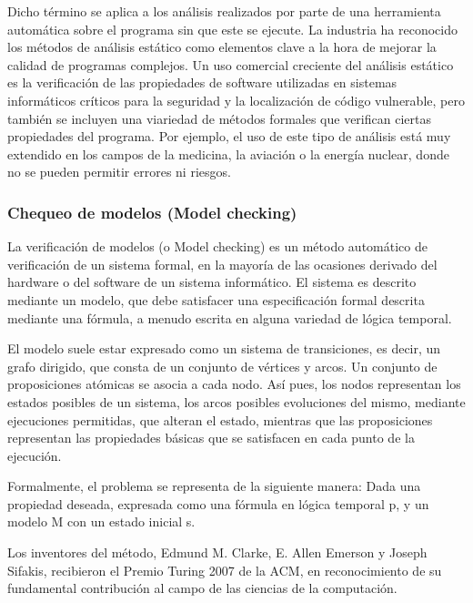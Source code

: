 Dicho t\'ermino se aplica a los an\'alisis realizados por parte de una herramienta autom\'atica sobre el programa sin que este se ejecute. La industria ha reconocido los m\'etodos de an\'alisis est\'atico como elementos clave a la hora de mejorar la calidad de programas complejos. Un uso comercial creciente del an\'alisis est\'atico es la verificaci\'on de las propiedades de software utilizadas en sistemas inform\'aticos cr\'iticos para la seguridad y la localizaci\'on de c\'odigo vulnerable, pero tambi\'en se incluyen una viariedad de m\'etodos formales que verifican ciertas propiedades del programa. Por ejemplo, el uso de este tipo de an\'alisis est\'a muy extendido en los campos de la medicina, la aviaci\'on o la energ\'ia nuclear, donde no se pueden permitir errores ni riesgos.


\subsubsection*{Chequeo de modelos (Model checking)}
\label{ap2:sec:modelchecking}

La verificaci\'on de modelos (o Model checking) es un m\'etodo autom\'atico de verificaci\'on de un sistema formal, en la mayor\'ia de las ocasiones derivado del hardware o del software de un sistema inform\'atico. El sistema es descrito mediante un modelo, que debe satisfacer una especificaci\'on formal descrita mediante una f\'ormula, a menudo escrita en alguna variedad de l\'ogica temporal.

El modelo suele estar expresado como un sistema de transiciones, es decir, un grafo dirigido, que consta de un conjunto de v\'ertices y arcos. Un conjunto de proposiciones at\'omicas se asocia a cada nodo. As\'i pues, los nodos representan los estados posibles de un sistema, los arcos posibles evoluciones del mismo, mediante ejecuciones permitidas, que alteran el estado, mientras que las proposiciones representan las propiedades b\'asicas que se satisfacen en cada punto de la ejecuci\'on.

Formalmente, el problema se representa de la siguiente manera: Dada una propiedad deseada, expresada como una f\'ormula en l\'ogica temporal p, y un modelo M con un estado inicial s.

Los inventores del m\'etodo, Edmund M. Clarke, E. Allen Emerson y Joseph Sifakis, recibieron el Premio Turing 2007 de la ACM, en reconocimiento de su fundamental contribuci\'on al campo de las ciencias de la computaci\'on.

